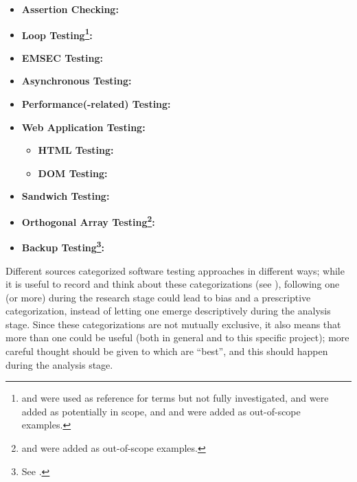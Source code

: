 \begin{itemize}
      \item \textbf{Assertion Checking:} \citet{LahiriEtAl2013, ChalinEtAl2006,
                  BerdineEtAl2006}
      \item \textbf{Loop Testing\footnote{\citep{ISO2015} and \citep{ISO2022}
                        were used as reference for terms but not fully
                        investigated, \citep{TrudnowskiEtAl2017} and
                        \citep{PierreEtAl2017} were added as potentially in
                        scope, and \citep{Goralski1999} and
                        \citep{Dominguez-PumarEtAl2020} were added as
                        out-of-scope examples.}:} \citet{DhokAndRamanathan2016,
                  GodefroidAndLuchaup2011, PreußeEtAl2012,
                  ForsythEtAl2004}
      \item \textbf{EMSEC Testing:} \citet{ZhouEtAl2012, ISO2021}
      \item \textbf{Asynchronous Testing:} \citet{JardEtAl1999}
      \item \textbf{Performance(-related) Testing:} \citet{Moghadam2019}
      \item \textbf{Web Application Testing:} \citet{DoğanEtAl2014, Kam2008}
            \begin{itemize}
                  \item \textbf{HTML Testing:} \citet{ChoudharyEtAl2010,
                              SneedAndGöschl2000, Gerrard2000b}
                  \item \textbf{DOM Testing:} \citet{BajammalAndMesbah2018}
            \end{itemize}
      \item \textbf{Sandwich Testing:} \citet{SharmaEtAl2021,
                  SangwanAndLaPlante2006}
      \item \textbf{Orthogonal Array Testing\footnote{
                        \citep{YuEtAl2011} and \citep{Tsui2007} were added as
                        out-of-scope examples.}:} \citet{Mandl1985, Valcheva2013}
      \item \textbf{Backup Testing\footnote{See .}:}
            \citet{Bas2024}
\end{itemize}

Different sources categorized software testing approaches in different ways;
while it is useful to record and think about these categorizations (see
), following one (or more) during the research
stage could lead to bias and a prescriptive categorization, instead of letting
one emerge descriptively during the analysis stage. Since these categorizations
are not mutually exclusive, it also means that more than one could be useful
(both in general and to this specific project); more careful thought should be
given to which are ``best'', and this should happen during the analysis stage.

